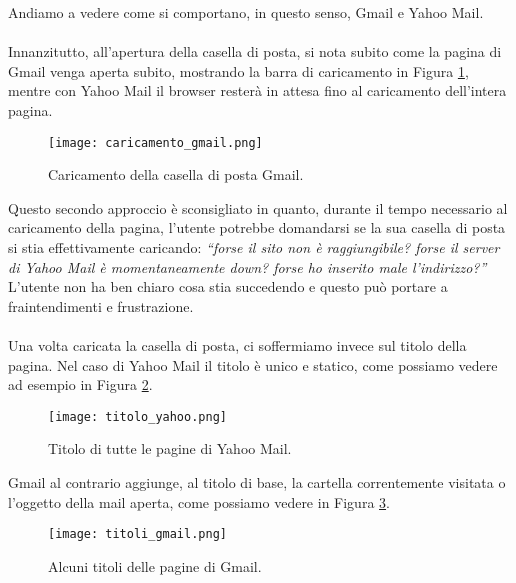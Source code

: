 		Andiamo a vedere come si comportano, in questo senso, Gmail e Yahoo Mail.\\
		\\
		Innanzitutto, all'apertura della casella di posta, si nota subito come la pagina di Gmail venga aperta subito, mostrando la barra di caricamento in Figura \ref{fig:caricamento_gmail}, mentre con Yahoo Mail il browser resterà in attesa fino al caricamento dell'intera pagina.
		\begin{figure}[h!]
			\begin{center}
				\texttt{[image: caricamento\_gmail.png]}
			\end{center}
			\caption[Caricamento in Gmail]{Caricamento della casella di posta Gmail.}
			\label{fig:caricamento_gmail}
		\end{figure}
		
		Questo secondo approccio è sconsigliato in quanto, durante il tempo necessario al caricamento della pagina, l'utente potrebbe domandarsi se la sua casella di posta si stia effettivamente caricando: \textit{``forse il sito non è raggiungibile? forse il server di Yahoo Mail è momentaneamente down? forse ho inserito male l'indirizzo?''} L'utente non ha ben chiaro cosa stia succedendo e questo può portare a fraintendimenti e frustrazione.\\
		\\
		
		Una volta caricata la casella di posta, ci soffermiamo invece sul titolo della pagina. Nel caso di Yahoo Mail il titolo è unico e statico, come possiamo vedere ad esempio in Figura \ref{fig:titolo_yahoo}.
		\begin{figure}[h!]
			\begin{center}
				\texttt{[image: titolo\_yahoo.png]}
			\end{center}
			\caption[Titolo di Yahoo Mail]{Titolo di tutte le pagine di Yahoo Mail.}
			\label{fig:titolo_yahoo}
		\end{figure}
		
		Gmail al contrario aggiunge, al titolo di base, la cartella correntemente visitata o l'oggetto della mail aperta, come possiamo vedere in Figura \ref{fig:titoli_gmail}.
		\begin{figure}[h!]
			\begin{center}
				\texttt{[image: titoli\_gmail.png]}
			\end{center}
			\caption[Titoli di Gmail]{Alcuni titoli delle pagine di Gmail.}
			\label{fig:titoli_gmail}
		\end{figure}
		\\
		
